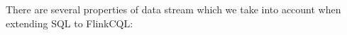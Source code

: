 
	







There are several properties of data stream which we take into account when extending SQL to FlinkCQL:


